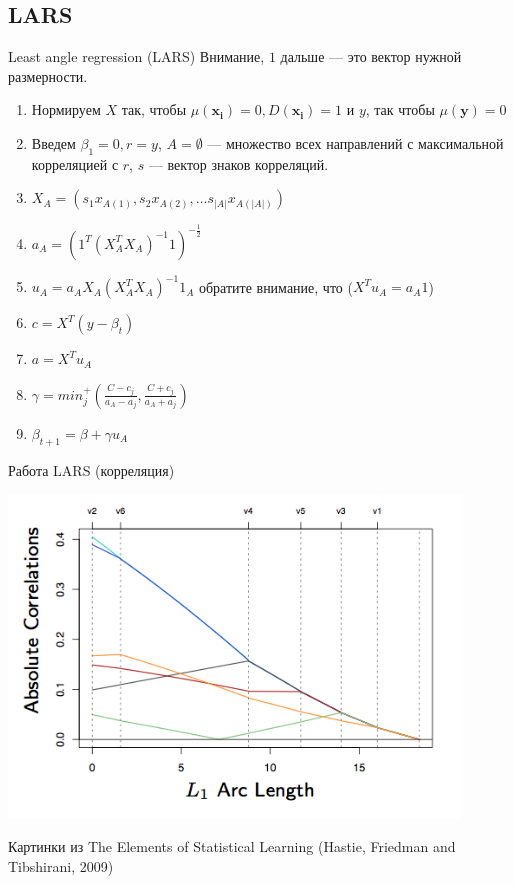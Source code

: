\documentclass[14pt, fleqn, xcolor={dvipsnames, table}]{beamer}
\begin{document}
\subsection{LARS}
\begin{frame}{Least angle regression (LARS)}
\small
Внимание, $1$ дальше --- это вектор нужной размерности.
\begin{enumerate}
  \item Нормируем $X$ так, чтобы $\mu(\mathbf{x_i}) = 0, D(\mathbf{x_i}) = 1$ и $y$, так чтобы $\mu(\mathbf{y}) = 0$
  \item Введем $\beta_1 = 0, r = y$, $A = \emptyset$ --- множество всех направлений с максимальной корреляцией с $r$, $s$ --- вектор знаков корреляций.
  \item $X_A = \left(s_1x_{A(1)}, s_2x_{A(2)}, \ldots s_{|A|}x_{A(|A|)}\right)$
  \item $a_A = \left(1^T (X_A^TX_A)^{-1}1\right)^{-\frac{1}{2}}$
  \item $u_A = a_AX_A(X_A^TX_A)^{-1}1_A$ обратите внимание, что ($X^Tu_A = a_A 1$)
  \item $c = X^T (y - \beta_t)$
  \item $a = X^T u_A$
  \item $\gamma = min^+_j \left(\frac{C - c_j}{a_A - a_j}, \frac{C + c_j}{a_A + a_j}\right)$
  \item $\beta_{t+1} = \beta + \gamma u_A$
\end{enumerate}
\end{frame}

\begin{frame}{Работа LARS (корреляция)}
\begin{center}
\includegraphics[width=0.9\textwidth]{3_14.png} 
\end{center}
\footnotesize
Картинки из The Elements of Statistical Learning (Hastie, Friedman and Tibshirani, 2009)
\end{frame}
\end{document}
